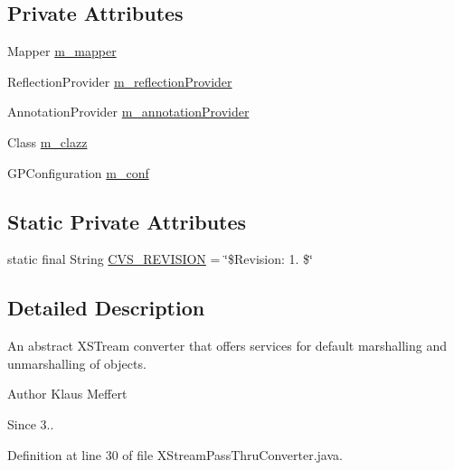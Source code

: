 \subsection*{Private Attributes}
\begin{DoxyCompactItemize}
\item 
Mapper \hyperlink{classorg_1_1jgap_1_1util_1_1_x_stream_pass_thru_converter_a9e7f796278d14f428fb555dfadace1a9}{m\-\_\-mapper}
\item 
Reflection\-Provider \hyperlink{classorg_1_1jgap_1_1util_1_1_x_stream_pass_thru_converter_abbdb06abd810f8dfca417bb04b2bd217}{m\-\_\-reflection\-Provider}
\item 
Annotation\-Provider \hyperlink{classorg_1_1jgap_1_1util_1_1_x_stream_pass_thru_converter_a753ba49f233df92415b1fa62a2717a9d}{m\-\_\-annotation\-Provider}
\item 
Class \hyperlink{classorg_1_1jgap_1_1util_1_1_x_stream_pass_thru_converter_a835b79066b6d25abd4ab1cc49928065c}{m\-\_\-clazz}
\item 
G\-P\-Configuration \hyperlink{classorg_1_1jgap_1_1util_1_1_x_stream_pass_thru_converter_a9c910a3205c4a8cce489e8acddf089f0}{m\-\_\-conf}
\end{DoxyCompactItemize}
\subsection*{Static Private Attributes}
\begin{DoxyCompactItemize}
\item 
static final String \hyperlink{classorg_1_1jgap_1_1util_1_1_x_stream_pass_thru_converter_a0509e893e2821c65dbe3812be612db35}{C\-V\-S\-\_\-\-R\-E\-V\-I\-S\-I\-O\-N} = \char`\"{}\$Revision\-: 1. \$\char`\"{}
\end{DoxyCompactItemize}


\subsection{Detailed Description}
An abstract X\-S\-Tream converter that offers services for default marshalling and unmarshalling of objects.

\begin{DoxyAuthor}{Author}
Klaus Meffert 
\end{DoxyAuthor}
\begin{DoxySince}{Since}
3.. 
\end{DoxySince}


Definition at line 30 of file X\-Stream\-Pass\-Thru\-Converter.\-java.



